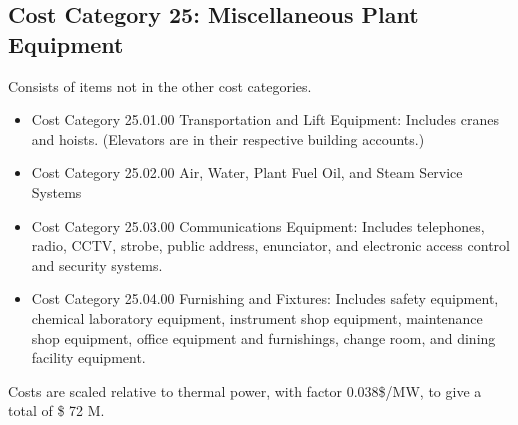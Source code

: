 \subsection{Cost Category 25: Miscellaneous Plant Equipment}  %

Consists of items not in the other cost categories.

\begin{itemize}

\item Cost Category 25.01.00 Transportation and Lift Equipment: Includes cranes and hoists. (Elevators are in their respective building accounts.)

\item  Cost Category 25.02.00 Air, Water, Plant Fuel Oil, and Steam Service Systems

\item  Cost Category 25.03.00 Communications Equipment: Includes telephones, radio, CCTV, strobe, public address, enunciator, and electronic access control and security systems.

\item  Cost Category 25.04.00 Furnishing and Fixtures: Includes safety equipment, chemical laboratory equipment, instrument shop equipment, maintenance shop equipment, office equipment and furnishings, change room, and dining facility equipment.

\end{itemize}

Costs are scaled relative to thermal power, with factor 0.038\$/MW, to give a total of \$ 72 M. 
